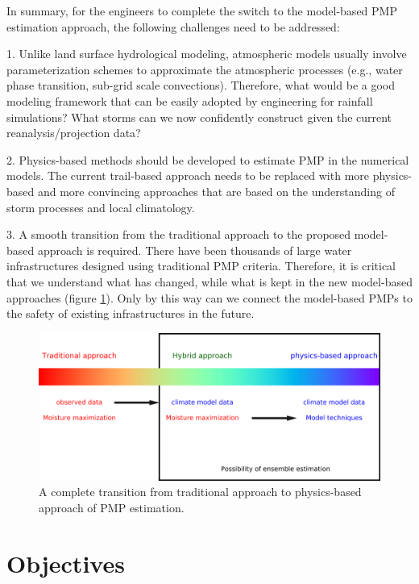 \vskip 0.4in
In summary, for the engineers to complete the switch to the model-based PMP estimation approach, the following challenges need to be addressed:

1. Unlike land surface hydrological modeling, atmospheric models usually involve parameterization schemes to approximate the atmospheric processes (e.g., water phase transition, sub-grid scale convections). Therefore, what would be a good modeling framework that can be easily adopted by engineering for rainfall simulations? What storms can we now confidently construct given the current reanalysis/projection data?

2. Physics-based methods should be developed to estimate PMP in the numerical models. The current trail-based approach needs to be replaced with more physics-based and more convincing approaches that are based on the understanding of storm processes and local climatology.

3. A smooth transition from the traditional approach to the proposed model-based approach is required. There have been thousands of large water infrastructures designed using traditional PMP criteria. Therefore, it is critical that we understand what has changed, while what is kept in the new model-based approaches (figure \ref{fig:1-1}). Only by this way can we connect the model-based PMPs to the safety of existing infrastructures in the future.

\begin{figure}[htbp]
	\centering
	\includegraphics[width=\linewidth]{pics/ch1/fig1.png}
	\caption{A complete transition from traditional approach to physics-based approach of PMP estimation.}
    \label{fig:1-1}
\end{figure}

\section {Objectives}

